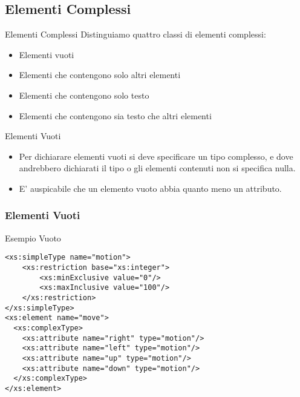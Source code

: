\documentclass{beamer}
\begin{document}
   \subsection{Elementi Complessi}
   \begin{frame}{Elementi Complessi}
   Distinguiamo quattro classi di elementi complessi:
   \begin{itemize}
   \item Elementi vuoti
   \item Elementi che contengono solo altri elementi
   \item Elementi che contengono solo testo
   \item Elementi che contengono sia testo che altri elementi
   \end{itemize}
   \end{frame}
	\begin{frame}[containsverbatim]{Elementi Vuoti}
	\begin{itemize}
	\item Per dichiarare elementi vuoti si deve specificare un tipo complesso, e dove andrebbero dichiarati il tipo o gli elementi contenuti non si specifica nulla.\bigskip
	\item E' auspicabile che un elemento vuoto abbia quanto meno un attributo.
	\end{itemize}
	\end{frame}
	\subsubsection{Elementi Vuoti}
	\begin{frame}[containsverbatim]
	\begin{block}{Esempio Vuoto}
	\begin{lstlisting}
<xs:simpleType name="motion">
	<xs:restriction base="xs:integer">
		<xs:minExclusive value="0"/>
		<xs:maxInclusive value="100"/>
	</xs:restriction>
</xs:simpleType>
<xs:element name="move">
  <xs:complexType>
    <xs:attribute name="right" type="motion"/>
    <xs:attribute name="left" type="motion"/>
    <xs:attribute name="up" type="motion"/>
    <xs:attribute name="down" type="motion"/>
  </xs:complexType>
</xs:element> 
	\end{lstlisting}
	\end{block}
	\end{frame}
\end{document}
